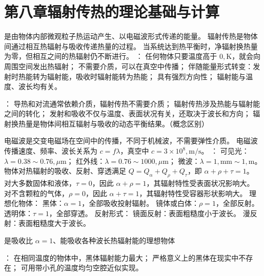 \section{第八章\quad 辐射传热的理论基础与计算}


是由物体内部微观粒子热运动产生、以电磁波形式传递的能量。
辐射传热是物体间通过相互热辐射与吸收传递热量的过程。
当系统达到热平衡时，净辐射换热量为零，但相互之间的热辐射仍不断进行。
：
任何物体只要温度高于 $0,\mathrm{K}$，就会向周围空间发出热辐射；
不需要介质，可以在真空中传播；
伴随能量形式转变：发射时热能转为辐射能，吸收时辐射能转为热能；
具有强烈方向性；
辐射能与温度、波长均有关。

：
导热和对流通常依赖介质，辐射传热不需要介质；
辐射传热涉及热能与辐射能之间的转化；
发射和吸收不仅与温度、表面状况有关，还取决于波长和方向；
辐射换热量是物体间相互辐射与吸收的动态平衡结果。（概念区别）

电磁波是交变电磁场在空间中的传播，不同于机械波，不需要弹性介质。
电磁波传播速度、频率、波长关系为 $c=f\lambda$，真空中 $c=3\times10^8,\mathrm{m}/\mathrm{s}$。
：
可见光：$\lambda=0.38\sim0.76,\mu\mathrm{m}$；
红外线：$\lambda=0.76\sim1000,\mu\mathrm{m}$；
微波：$\lambda=1,\mathrm{mm}\sim1,\mathrm{m}$。
物体对热辐射的吸收、反射、穿透满足 $Q=Q_\alpha+Q_\rho+Q_\tau$，即 $\alpha+\rho+\tau=1$。
对大多数固体和液体，$\tau=0$，因此 $\alpha+\rho=1$，其辐射特性受表面状况影响大。
对不含颗粒的气体，$\rho=0$，因此 $\alpha+\tau=1$，其辐射特性受容器形状影响大。
理想化物体：
黑体：$\alpha=1$，全部吸收投射辐射。
镜体或白体：$\rho=1$，全部反射。
透明体：$\tau=1$，全部穿透。
反射形式：
镜面反射：表面粗糙度小于波长。
漫反射：表面粗糙度大于波长。

\divider


是吸收比 $\alpha=1$、能吸收各种波长热辐射能的理想物体

：
在相同温度的物体中，黑体辐射能力最大；
严格意义上的黑体在现实中不存在；
可用带小孔的温度均匀空腔近似实现。

